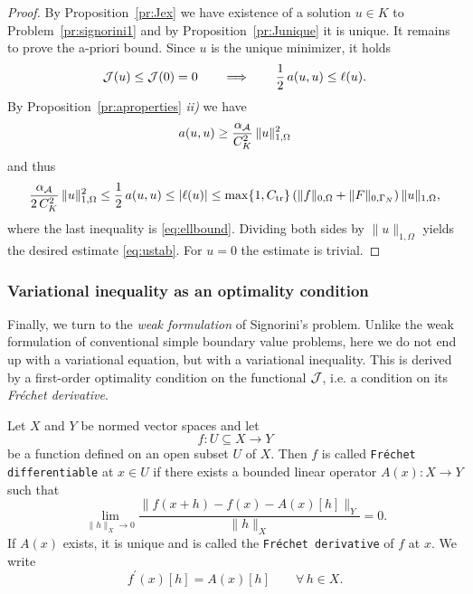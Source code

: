 \begin{proof}
	By Proposition~\ref{pr:Jex} we have existence of a solution $u\in K$ to Problem~\ref{pr:signorini1} and by Proposition~\ref{pr:Junique} it is unique. It remains to prove the a-priori bound. Since $u$ is the unique minimizer, it holds
	\begin{equation*}
		{\mathcal J}(u)\le {\mathcal J}(0)=0\qquad\Longrightarrow\qquad \frac{1}{2}\,a(u,u)\le \ell(u).
	\end{equation*}
	By Proposition~\ref{pr:aproperties} {\em ii)} we have
	\begin{equation*}
		a(u,u)\ge \frac{\alpha_{\mathcal A}}{C_K^2}\,\|u\|_{1,\Omega}^2
	\end{equation*}
	and thus
	\begin{equation*}
		\frac{\alpha_{\mathcal A}}{2\,C_K^2}\,\|u\|_{1,\Omega}^2\le \frac{1}{2}\,a(u,u)\le |\ell(u)|\le  \max\{1,C_{\mathrm{tr}}\}\left(\|f\|_{0,\Omega} +\|F\|_{0,\Gamma_N}\right)\|u\|_{1,\Omega},
	\end{equation*}
	where the last inequality is \eqref{eq:ellbound}. Dividing both sides by $\|u\|_{1,\Omega}$ yields the desired estimate \eqref{eq:ustab}. For $u=0$ the estimate is trivial.
\end{proof}

\subsubsection{Variational inequality as an optimality condition}
Finally, we turn to the {\em weak formulation} of Signorini's problem. Unlike the weak formulation of conventional simple boundary value problems, here we do not end up with a variational equation, but with a variational inequality. This is derived by a first-order optimality condition on the functional ${\mathcal J}$, i.e. a condition on its {\em Fréchet derivative}.

\begin{definition}\label{def:frechetdiff}
	Let $X$ and $Y$ be normed vector spaces and let
	\begin{equation*}
		f:U\subseteq X\to Y
	\end{equation*}
	be a function defined on an open subset $U$ of $X$. Then $f$ is called {\tt Fréchet differentiable} at $x \in U$ if there exists a bounded linear operator $A(x):X\to Y$ such that
	\begin{equation}\label{eq:frechetquotient}
		\lim_{\|h\|_X\to 0} \frac{\|f(x+h)-f(x)-A(x)[h]\|_Y}{\|h\|_X}=0.
	\end{equation}
	If $A(x)$ exists, it is unique and is called the {\tt Fréchet derivative} of $f$ at $x$. We write
	\begin{equation*}
		f^\prime(x)[h]=A(x)[h]\qquad \forall\, h\in X.
	\end{equation*}
\end{definition}

